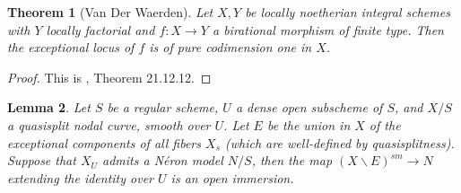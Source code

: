 \documentclass[a4paper,10pt,twoside]{article}
\newcommand{\ra}{\rightarrow}
\newtheorem{thm}{Theorem}[section]
\newtheorem{lem}[thm]{Lemma}
\theoremstyle{definition}
\theoremstyle{remark}
\begin{document}
\begin{thm}[Van Der Waerden]\label{Van Der Waerden}
Let $X,Y$ be locally noetherian integral schemes with $Y$ locally factorial and $f:X\ra Y$ a birational morphism of finite type. Then the exceptional locus of $f$ is of pure codimension one in $X$.
\end{thm}

\begin{proof}
This is \cite{EGA4.4}, Theorem 21.12.12.
\end{proof}

\begin{lem}\label{Van der Waerden dans un espace algebrique pour trouver les ouverts du NM (lemme)}
Let $S$ be a regular scheme, $U$ a dense open subscheme of $S$, and $X/S$ a quasisplit nodal curve, smooth over $U$. Let $E$ be the union in $X$ of the exceptional components of all fibers $X_s$ (which are well-defined by quasisplitness). Suppose that $X_U$ admits a N\'eron model $N/S$, then the map $(X\backslash E)^{sm}\ra N$ extending the identity over $U$ is an open immersion.
\end{lem}
\end{document}
